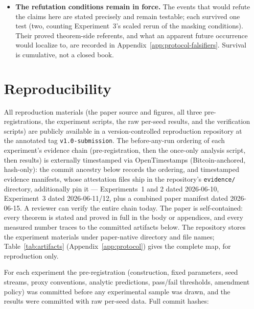 \documentclass[twocolumn,10pt]{article}
\theoremstyle{definition}
\theoremstyle{remark}
\begin{document}
\begin{itemize}
(Open Problem~\ref{op:frontier}). The proved payment floors
(Proposition~\ref{prop:payment}) are family- and
convention-restricted: the structure is convention-robust, the
constants are not. Universal-accounting language should not be read
into any result here.
\item \textbf{The refutation conditions remain in force.} The events
that would refute the claims here are stated precisely and remain
testable; each survived one test (two, counting Experiment~3's scaled
rerun of the masking conditions). Their proved theorem-side referents,
and what an apparent future occurrence would localize to, are
recorded in Appendix~\ref{app:protocol-falsifiers}. Survival is
cumulative, not a closed book.
\end{itemize}

\section{Reproducibility}
\label{sec:reproducibility}

All reproduction materials (the paper source and figures, all three
pre-registrations, the experiment scripts, the raw per-seed results,
and the verification scripts) are publicly available in a
version-controlled reproduction repository \cite{porepro} at the
annotated tag \texttt{v1.0-submission}. The
before-any-run ordering of each experiment's evidence chain
(pre-registration, then the once-only analysis script, then results)
is externally timestamped via OpenTimestamps (Bitcoin-anchored,
hash-only): the commit ancestry below records the ordering, and
timestamped evidence manifests, whose attestation files ship in the
repository's \texttt{evidence/} directory, additionally pin it ---
Experiments~1 and 2 dated 2026-06-10, Experiment~3 dated
2026-06-11/12, plus a combined paper manifest dated 2026-06-15. A
reviewer can verify the entire chain today. The paper is
self-contained: every theorem is
stated and proved in full in the body or appendices, and every
measured number traces to
the committed artifacts below. The repository stores the experiment
materials under paper-native directory and file names;
Table~\ref{tab:artifacts} (Appendix~\ref{app:protocol}) gives the
complete map, for reproduction only.

For each experiment the pre-registration (construction, fixed parameters,
seed streams, proxy conventions, analytic predictions, pass/fail
thresholds, amendment policy) was committed before any experimental sample
was drawn, and the results were committed with raw per-seed data. Full
commit hashes:
\end{document}
